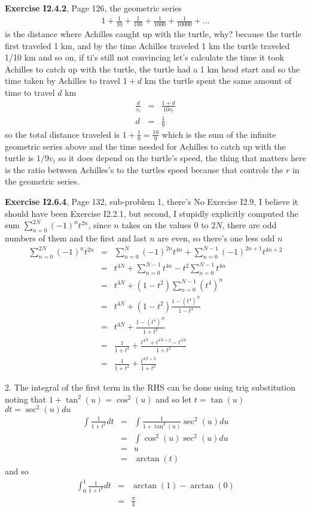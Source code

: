 \documentclass[aps,preprint,preprintnumbers,nofootinbib,showpacs,prd]{revtex4-1}
\newcommand{\nbea}{\begin{eqnarray*}}
\newcommand{\neea}{\end{eqnarray*}}
\begin{document}
{\bf Exercise I2.4.2}, Page 126, the geometric series
%
\nbea
1 + \frac{1}{10} + \frac{1}{100} + \frac{1}{1000} + \frac{1}{10000} + \ldots
\neea
%
is the distance where Achilles caught up with the turtle, why? because the turtle first traveled 1 km, and by the time Achilles traveled 1 km the turtle traveled 1/10 km and so on, if ti's still not convincing let's calculate the time it took Achilles to catch up with the turtle, the turtle had a 1 km head start and so the time taken by Achilles to travel $1+d$ km the turtle spent the same amount of time to travel $d$ km
%
\nbea
\frac{d}{v_t} & = & \frac{1+d}{10v_t} \\
d & = & \frac{1}{9}
\neea
%
so the total distance traveled is $1 + \frac{1}{9} = \frac{10}{9}$ which is the sum of the infinite geometric series above and the time needed for Achilles to catch up with the turtle is $1/9v_t$ so it does depend on the turtle's speed, the thing that matters here is the ratio between Achilles's to the turtles speed because that controls the $r$ in the geometric series.

{\bf Exercise I2.6.4}, Page 132, sub-problem 1, there's No Exercise I2.9, I believe it should have been Exercise I2.2.1, but second, I stupidly explicitly computed the sum $\sum_{n=0}^{2N}(-1)^nt^{2n}$, since $n$ takes on the values $0$ to $2N$, there are odd numbers of them and the first and last $n$ are even, so there's one less odd $n$
%
\nbea
\sum_{n=0}^{2N}(-1)^nt^{2n} & = & \sum_{n=0}^{N}(-1)^{2n}t^{4n} + \sum_{n=0}^{N-1}(-1)^{2n+1}t^{4n+2} \\
& = & t^{4N} + \sum_{n=0}^{N-1}t^{4n} - t^2 \sum_{n=0}^{N-1}t^{4n} \\
& = & t^{4N} + (1 - t^2) \sum_{n=0}^{N-1}(t^{4})^{n} \\
& = & t^{4N} + (1 - t^2) \frac{1-(t^4)^{N}}{1-t^4} \\
& = & t^{4N} + \frac{1-(t^4)^{N}}{1+t^2} \\
& = & \frac{1}{1+t^2} + \frac{t^{4N} + t^{4N+2} - t^{4N}}{1+t^2} \\
& = & \frac{1}{1+t^2} + \frac{t^{4N+2}}{1+t^2} 
\neea
%

2. The integral of the first term in the RHS can be done using trig substitution noting that $1+\tan^2(u) = \cos^2(u)$ and so let $t=\tan(u)$ $dt = \sec^2(u)du$
%
\nbea
\int \frac{1}{1+t^2} dt & = & \int \frac{1}{1+\tan^2(u)}\sec^2(u)du \\
& = & \int \cos^2(u)\sec^2(u) du \\
& = & u \\
& = &\arctan(t)
\neea
%
and so
%
\nbea
\int_0^1 \frac{1}{1+t^2} dt & = & \arctan(1) - \arctan(0) \\
& = & \frac{\pi}{4}
\neea
%
\end{document}
